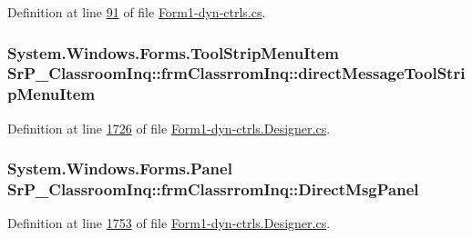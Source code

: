 \-Definition at line \hyperlink{_form1-dyn-ctrls_8cs_source_l00091}{91} of file \hyperlink{_form1-dyn-ctrls_8cs_source}{\-Form1-\/dyn-\/ctrls.\-cs}.

\hypertarget{class_sr_p___classroom_inq_1_1frm_classrrom_inq_a8df7e0c2f5ac4cb1494004d85940a786}{
\subsubsection[{direct\-Message\-Tool\-Strip\-Menu\-Item}]{\setlength{\rightskip}{0pt plus 5cm}\-System.\-Windows.\-Forms.\-Tool\-Strip\-Menu\-Item {\bf \-Sr\-P\-\_\-\-Classroom\-Inq\-::frm\-Classrrom\-Inq\-::direct\-Message\-Tool\-Strip\-Menu\-Item}}}
\label{class_sr_p___classroom_inq_1_1frm_classrrom_inq_a8df7e0c2f5ac4cb1494004d85940a786}


\-Definition at line \hyperlink{_form1-dyn-ctrls_8_designer_8cs_source_l01726}{1726} of file \hyperlink{_form1-dyn-ctrls_8_designer_8cs_source}{\-Form1-\/dyn-\/ctrls.\-Designer.\-cs}.

\hypertarget{class_sr_p___classroom_inq_1_1frm_classrrom_inq_a3241f0f690675052aff4224bc4fabc3d}{
\subsubsection[{\-Direct\-Msg\-Panel}]{\setlength{\rightskip}{0pt plus 5cm}\-System.\-Windows.\-Forms.\-Panel {\bf \-Sr\-P\-\_\-\-Classroom\-Inq\-::frm\-Classrrom\-Inq\-::\-Direct\-Msg\-Panel}}}
\label{class_sr_p___classroom_inq_1_1frm_classrrom_inq_a3241f0f690675052aff4224bc4fabc3d}


\-Definition at line \hyperlink{_form1-dyn-ctrls_8_designer_8cs_source_l01753}{1753} of file \hyperlink{_form1-dyn-ctrls_8_designer_8cs_source}{\-Form1-\/dyn-\/ctrls.\-Designer.\-cs}.

